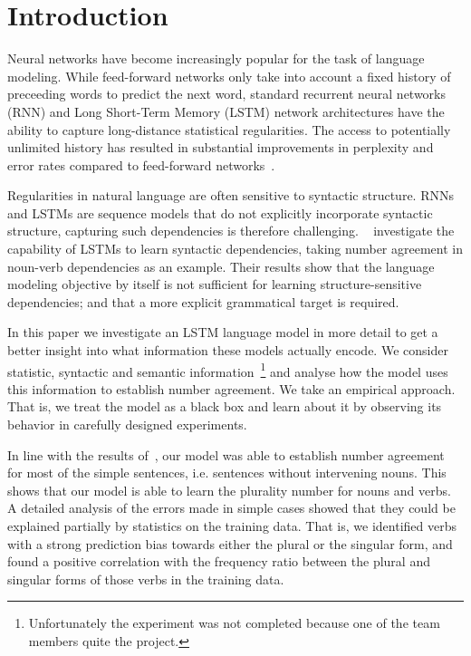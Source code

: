 \section{Introduction}

Neural networks have become increasingly popular
for the task of language modeling.
While feed-forward networks only take into account
a fixed history of preceeding words to predict the next word,
standard recurrent neural networks (RNN) and 
Long Short-Term Memory (LSTM) network architectures
have the ability to capture long-distance statistical regularities.
The access to potentially unlimited history 
has resulted in substantial improvements 
in perplexity and error rates
compared to feed-forward networks~\citep{Mikolov2010,Sundermeyer2013}. 

Regularities in natural language are often sensitive to syntactic structure.
RNNs and LSTMs are sequence models that do not explicitly
incorporate syntactic structure,
capturing such dependencies is therefore challenging.
~\cite{Linzen2016} investigate the capability
of LSTMs to learn syntactic dependencies, taking
number agreement in noun-verb dependencies as an example.
Their results show that the language modeling objective by itself
is not sufficient for learning structure-sensitive dependencies;
and that a more explicit grammatical target is required.

In this paper we investigate an LSTM language model
in more detail to get a better insight into what 
information these models actually encode.
We consider statistic, syntactic and 
semantic information~\footnote{
Unfortunately the experiment was not completed
because one of the team members quite the project.
}
and analyse how the model uses this information
to establish number agreement. 
We take an empirical approach.
That is, we treat the model as a black box
and learn about it by observing its behavior
in carefully designed experiments.

In line with the results of~\citep{Linzen2016},
our model was able to establish number agreement 
for most of the simple sentences,
i.e. sentences without intervening nouns.
This shows that our model is able to learn the 
plurality number for nouns and verbs.
A detailed analysis of the errors made in simple cases
showed that they could be explained partially by 
statistics on the training data.
That is, we identified verbs with a strong 
prediction bias towards
either the plural or the singular form,
and found a positive correlation with the
frequency ratio between the plural and singular forms
of those verbs in the training data.
%

